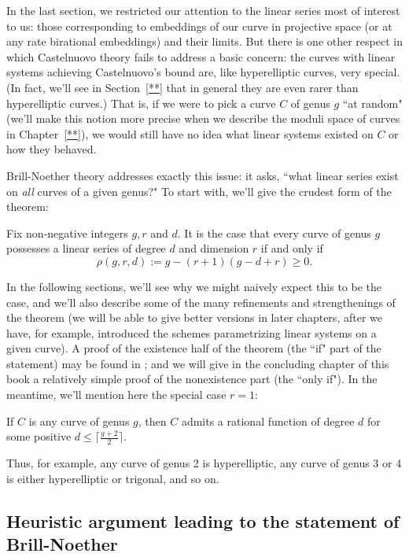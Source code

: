 In the last section, we restricted our attention to the linear series most of interest to us: those corresponding to embeddings of our curve in projective space (or at any rate birational embeddings) and their limits. But there is one other respect in which Castelnuovo theory fails to address a basic concern: the curves with linear systems achieving Castelnuovo's bound are, like hyperelliptic curves, very special. (In fact, we'll see in Section~\ref{**} that in general they are even rarer than hyperelliptic curves.) That is, if we were to pick a curve $C$ of genus $g$ ``at random" (we'll make this notion more precise when we describe the moduli space of curves in Chapter~\ref{**}), we would still have no idea what linear systems existed on $C$ or how they behaved.

Brill-Noether theory addresses exactly this issue: it asks, ``what linear series exist on \emph{all} curves of a given genus?" To start with, we'll give the crudest form of the theorem:

\begin{theorem}\label{basic BN}
Fix non-negative integers $g, r$ and $d$. It is the case that every curve of genus $g$ possesses a linear series of degree $d$ and dimension $r$ if and only if
$$
\rho(g,r,d) := g - (r+1)(g-d+r) \geq 0.
$$
\end{theorem}

In the following sections, we'll see why we might naively expect this to be the case, and we'll also describe some of the many refinements and strengthenings of the theorem (we will be able to give better versions in later chapters, after we have, for example, introduced the schemes parametrizing linear systems on a given curve). A proof of the existence half of the theorem (the ``if" part of the statement) may be found in \cite{3264}; and we will give in the concluding chapter of this book a relatively simple proof of the nonexistence part (the ``only if"). In the meantime, we'll mention here the special case $r=1$:

\begin{corollary}
If $C$ is any curve of genus $g$, then $C$ admits a rational function of degree $d$ for some positive $d \leq \lceil \frac{g+2}{2}\rceil$.
\end{corollary}

Thus, for example, any curve of genus 2 is hyperelliptic, any curve of genus 3 or 4 is either hyperelliptic or trigonal, and so on.

\subsection{Heuristic argument leading to the statement of Brill-Noether}

